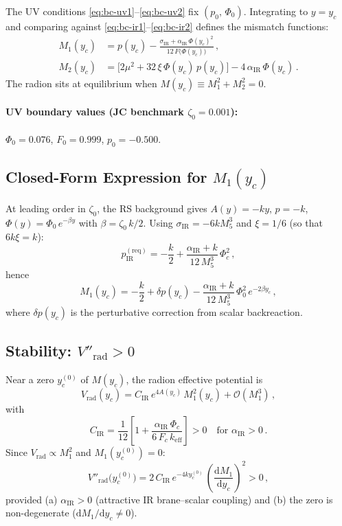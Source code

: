 The UV conditions \eqref{eq:bc-uv1}--\eqref{eq:bc-uv2} fix $(p_0,\,\Phi_0)$. Integrating to $y = y_c$ and comparing against \eqref{eq:bc-ir1}--\eqref{eq:bc-ir2} defines the mismatch functions:
\begin{align}
  M_1(y_c) &= p(y_c) - \frac{\sigma_{\mathrm{IR}} + \alpha_{\mathrm{IR}}\,\Phi(y_c)^2}{12\,F\bigl(\Phi(y_c)\bigr)}\,, \\[4pt]
  M_2(y_c) &= \bigl[2\mu^2 + 32\,\xi\,\Phi(y_c)\,p(y_c)\bigr] - 4\,\alpha_{\mathrm{IR}}\,\Phi(y_c)\,.
\end{align}
The radion sits at equilibrium when $M(y_c) \equiv M_1^2 + M_2^2 = 0$.

\paragraph{UV boundary values (JC benchmark $\zeta_0 = 0.001$):}
$\Phi_0 = 0.076$, $F_0 = 0.999$, $p_0 = -0.500$.

\subsection{Closed-Form Expression for $M_1(y_c)$}

At leading order in $\zeta_0$, the RS background gives $A(y) = -ky$, $p = -k$, $\Phi(y) = \Phi_0\,e^{-\beta y}$ with $\beta = \zeta_0\,k/2$. Using $\sigma_{\mathrm{IR}} = -6kM_5^3$ and $\xi = 1/6$ (so that $6k\xi = k$):
\begin{equation}
  p_{\mathrm{IR}}^{(\mathrm{req})} = -\frac{k}{2} + \frac{\alpha_{\mathrm{IR}} + k}{12\,M_5^3}\,\Phi_c^2\,,
\end{equation}
hence
\begin{equation}
  M_1(y_c) = -\frac{k}{2} + \delta p(y_c) - \frac{\alpha_{\mathrm{IR}} + k}{12\,M_5^3}\,\Phi_0^2\,e^{-2\beta y_c}\,,
\end{equation}
where $\delta p(y_c)$ is the perturbative correction from scalar backreaction.

\subsection{Stability: $V''_{\mathrm{rad}} > 0$}

Near a zero $y_c^{(0)}$ of $M(y_c)$, the radion effective potential is
\begin{equation}
  V_{\mathrm{rad}}(y_c) = C_{\mathrm{IR}}\,e^{4A(y_c)}\,M_1^2(y_c) + \mathcal{O}(M_1^3)\,,
\end{equation}
with
\begin{equation}
  C_{\mathrm{IR}} = \frac{1}{12}\left[1 + \frac{\alpha_{\mathrm{IR}}\,\Phi_c}{6\,F_c\,k_{\mathrm{eff}}}\right] > 0 \quad \text{for } \alpha_{\mathrm{IR}} > 0\,.
\end{equation}
Since $V_{\mathrm{rad}} \propto M_1^2$ and $M_1(y_c^{(0)}) = 0$:
\begin{equation}
  V''_{\mathrm{rad}}\bigl(y_c^{(0)}\bigr) = 2\,C_{\mathrm{IR}}\,e^{-4ky_c^{(0)}}\,\left(\frac{\mathrm{d}M_1}{\mathrm{d}y_c}\right)^{\!2} > 0\,,
\end{equation}
provided (a) $\alpha_{\mathrm{IR}} > 0$ (attractive IR brane--scalar coupling) and (b) the zero is non-degenerate ($\mathrm{d}M_1/\mathrm{d}y_c \neq 0$).

